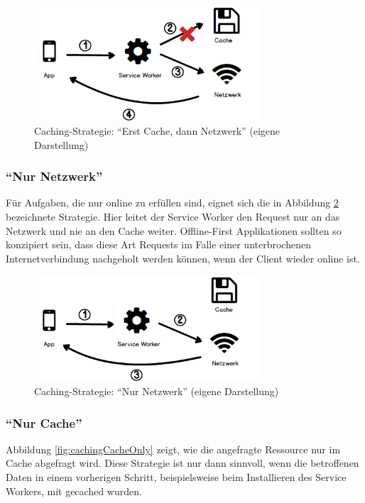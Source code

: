 \documentclass[a4paper, 12pt]{scrreprt}
\begin{document}
\begin{figure}[H]
	\centering
	\includegraphics[width=0.75\textwidth]{cachefirst.png}
	\caption[Caching-Strategie: \enquote{Erst Cache, dann Netzwerk}]{Caching-Strategie: \enquote{Erst Cache, dann Netzwerk} (eigene Darstellung)}
	\label{fig:cachingCacheFirst}
\end{figure}

\subsubsection{\enquote{Nur Netzwerk}}
Für Aufgaben, die nur online zu erfüllen sind, eignet sich die in Abbildung \ref{fig:cachingNetworkOnly} bezeichnete Strategie. Hier leitet der Service Worker den Request nur an das Netzwerk und nie an den Cache weiter. Offline-First Applikationen sollten so konzipiert sein, dass diese Art Requests im Falle einer unterbrochenen Internetverbindung nachgeholt werden können, wenn der Client wieder online ist.

\begin{figure}[H]
	\centering
	\includegraphics[width=0.75\textwidth]{networkonly.png}
	\caption[Caching-Strategie: \enquote{Nur Netzwerk}]{Caching-Strategie: \enquote{Nur Netzwerk} (eigene Darstellung)}
	\label{fig:cachingNetworkOnly}
\end{figure}

\subsubsection{\enquote{Nur Cache}}
Abbildung \ref{fig:cachingCacheOnly} zeigt, wie die angefragte Ressource nur im Cache abgefragt wird. Diese Strategie ist nur dann sinnvoll, wenn die betroffenen Daten in einem vorherigen Schritt, beispielsweise beim Installieren des Service Workers, mit gecached wurden.
\end{document}
